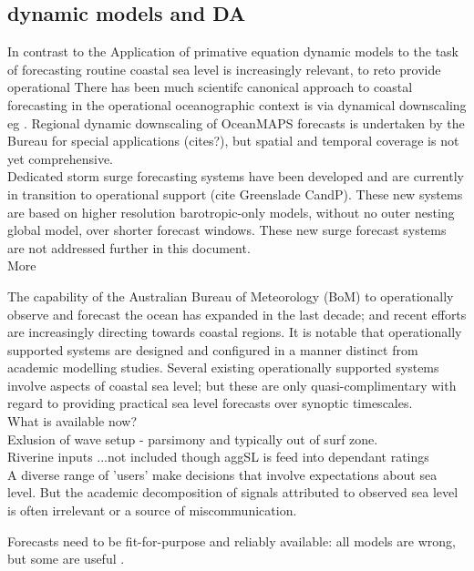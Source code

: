  
\subsection{dynamic models and DA}

In contrast to the 
Application of primative equation dynamic models to the task of forecasting routine coastal sea level is increasingly relevant,  to reto provide operational 
There has been much scientifc  canonical approach to coastal forecasting in the operational oceanographic context is via dynamical downscaling eg \cite{Paramygin:2017dx} \cite{Garzon:2016ds}.
Regional dynamic downscaling of OceanMAPS forecasts is undertaken by the Bureau for special applications (cites?),
but spatial and temporal coverage is not yet comprehensive.\\
Dedicated storm surge forecasting systems have been developed and are currently in transition to operational support (cite Greenslade CandP).   These new systems are based on higher resolution barotropic-only models, without no outer nesting global model, over shorter forecast windows. These new surge forecast systems are not addressed further in this document. \\


More

The capability of the Australian Bureau of Meteorology (BoM) to operationally observe and forecast the ocean has expanded in the last decade;
and recent efforts are increasingly directing towards coastal regions.  
It is notable that operationally supported systems are designed and configured in a manner distinct from academic modelling studies. 
Several existing operationally supported systems involve aspects of coastal sea level;
but these are only quasi-complimentary with regard to providing practical sea level forecasts over synoptic timescales. \\


What is available now?\\
Exlusion of wave setup - parsimony and typically out of surf zone.\\
Riverine inputs ...not included though aggSL is feed into dependant ratings \\


A diverse range of 'users' make decisions that involve expectations about sea level. 
But the academic decomposition of signals attributed to observed sea level is often irrelevant or a source of miscommunication. 

Forecasts need to be fit-for-purpose and reliably available: all models are wrong, but some are useful \cite{Box:1979hl} .

